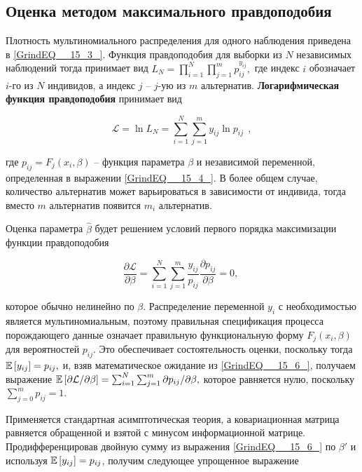 \subsection{Оценка методом максимального правдоподобия}

Плотность мультиномиального распределения для одного наблюдения приведена в \eqref{GrindEQ__15_3_}. Функция правдоподобия для выборки из $N$ независимых наблюдений тогда принимает вид $L_N=\prod^N_{i=1}{\prod^m_{j=1}{p^{y_{ij}}_{ij}}},$ где индекс $i$ обозначает $i$-го из $N$ индивидов, а индекс $j$ -- $j$-ую из $m$ альтернатив. \textbf{Логарифмическая функция правдоподобия} принимает вид

\begin{equation} \label{GrindEQ__15_5_} {\mathcal L}={\ln  L_N=\sum^N_{i=1}{\sum^m_{j=1}{y_{ij}{\ln  p_{ij}\ }}}\ }, 
\end{equation} 

где $p_{ij}=F_j(x_i,\beta )$ -- функция параметра $\beta $ и независимой переменной, определенная в выражении \eqref{GrindEQ__15_4_}. В более общем случае, количество альтернатив может варьироваться в зависимости от индивида, тогда вместо $m$ альтернатив появится $m_i$ альтернатив.

Оценка параметра $\widehat{\beta }$ будет решением  условий первого порядка максимизации функции правдоподобия

\begin{equation} 
\label{GrindEQ__15_6_} 
\frac{\partial {\mathcal L}}{\partial\beta }=\sum^N_{i=1}{\sum^m_{j=1}{\frac{y_{ij}}{p_{ij}}}}\frac{\partial p_{ij}}{\partial\beta }=0,\  
\end{equation} 

которое обычно нелинейно по $\beta $. Распределение переменной $y_i$ с необходимостью является мультиномиальным, поэтому правильная спецификация процесса порождающего данные означает правильную функциональную форму $F_j(x_i,\beta )$ для вероятностей $p_{ij}$. Это обеспечивает состоятельность оценки, поскольку тогда $\mathbb{E}\left[y_{ij}\right]=p_{ij},$ и, взяв математическое ожидание из \eqref{GrindEQ__15_6_}, получаем выражение $\mathbb{E}\left[{\partial {\mathcal L}}/{\partial \beta }\right]=\sum^N_{i=1}{\sum^m_{j=1}{{\partial p_{ij}}/{\partial \beta }}},$ которое равняется нулю, поскольку $\sum^m_{j=0}{p_{ij}}=1.$

Применяется стандартная асимптотическая теория, а ковариационная матрица равняется обращенной и взятой с минусом информационной матрице. Продифференцировав двойную сумму из выражения \eqref{GrindEQ__15_6_} по $\beta '$ и используя $\mathbb{E}\left[y_{ij}\right]=p_{ij}$, получим следующее упрощенное выражение

